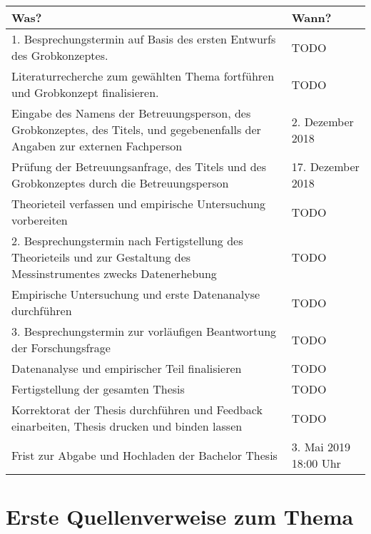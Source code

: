 \documentclass[12pt, twoside]{extarticle}
\begin{document}
\begin{center}
    \begin{tabular}{ | p{7cm} | l |}
    \hline
    Was? & Wann? \\ \hline
    1. Besprechungstermin auf Basis des ersten Entwurfs des Grobkonzeptes. & TODO \\ \hline
    
    Literaturrecherche zum gewählten Thema fortführen und Grobkonzept finalisieren. & TODO \\ \hline
    
    Eingabe des Namens der Betreuungsperson, des Grobkonzeptes, des Titels, und gegebenenfalls der Angaben zur externen Fachperson & 2. Dezember 2018 \\ \hline
    
    Prüfung der Betreuungsanfrage, des Titels und des Grobkonzeptes durch die Betreuungsperson & 17. Dezember 2018 \\ \hline
    
    Theorieteil verfassen und empirische Untersuchung vorbereiten & TODO \\ \hline
    
    2. Besprechungstermin nach Fertigstellung des Theorieteils und zur Gestaltung des Messinstrumentes zwecks Datenerhebung & TODO \\ \hline
    
    Empirische Untersuchung und erste Datenanalyse durchführen & TODO \\ \hline
    
    3. Besprechungstermin zur vorläufigen Beantwortung der Forschungsfrage & TODO \\ \hline
    
    Datenanalyse und empirischer Teil finalisieren & TODO \\ \hline
    
    Fertigstellung der gesamten Thesis & TODO \\ \hline
    
    Korrektorat der Thesis durchführen und Feedback einarbeiten, Thesis drucken und binden lassen & TODO \\ \hline
    
    Frist zur Abgabe und Hochladen der Bachelor Thesis & 3. Mai 2019 18:00 Uhr \\ \hline
    
    \end{tabular}
\end{center}


\newpage
\section{Erste Quellenverweise zum Thema}
\end{document}
